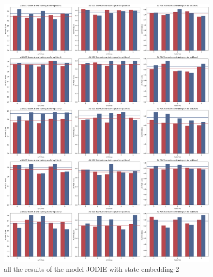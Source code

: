 \begin{figure}
    \centering
    \includegraphics[width=\textwidth]{figures/05_all_results2.png}
    \caption{all the results of the model JODIE with state embedding-2} 
    \label{fig:all_results2}
\end{figure}
